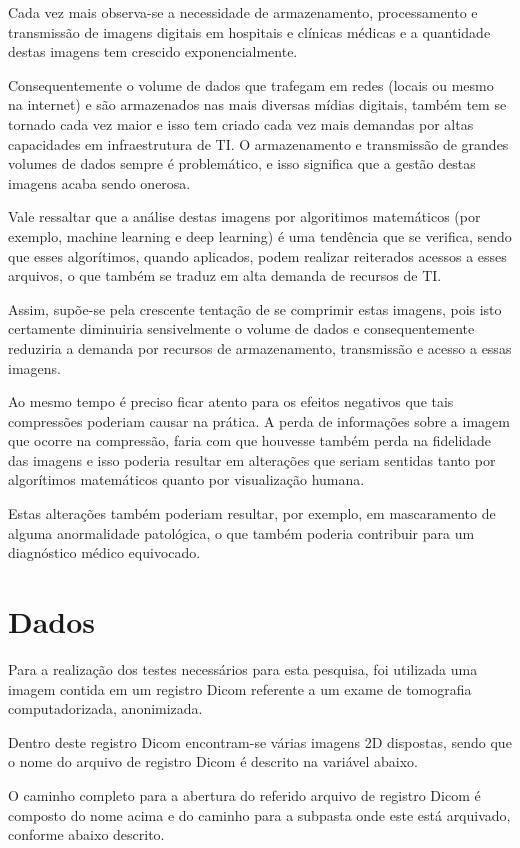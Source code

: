 \documentclass{IEEEtran}
\begin{document}
Cada vez mais observa-se a necessidade de armazenamento, processamento e
transmissão de imagens digitais em hospitais e clínicas médicas e a
quantidade destas imagens tem crescido exponencialmente.

Consequentemente o volume de dados que trafegam em redes (locais ou
mesmo na internet) e são armazenados nas mais diversas mídias digitais,
também tem se tornado cada vez maior e isso tem criado cada vez mais
demandas por altas capacidades em infraestrutura de TI. O armazenamento
e transmissão de grandes volumes de dados sempre é problemático, e isso
significa que a gestão destas imagens acaba sendo onerosa.

Vale ressaltar que a análise destas imagens por algoritimos matemáticos
(por exemplo, machine learning e deep learning) é uma tendência que se
verifica, sendo que esses algorítimos, quando aplicados, podem realizar
reiterados acessos a esses arquivos, o que também se traduz em alta
demanda de recursos de TI.

Assim, supõe-se pela crescente tentação de se comprimir estas imagens,
pois isto certamente diminuiria sensivelmente o volume de dados e
consequentemente reduziria a demanda por recursos de armazenamento,
transmissão e acesso a essas imagens.

Ao mesmo tempo é preciso ficar atento para os efeitos negativos que tais
compressões poderiam causar na prática. A perda de informações sobre a
imagem que ocorre na compressão, faria com que houvesse também perda na
fidelidade das imagens e isso poderia resultar em alterações que seriam
sentidas tanto por algorítimos matemáticos quanto por visualização
humana.

Estas alterações também poderiam resultar, por exemplo, em mascaramento
de alguma anormalidade patológica, o que também poderia contribuir para
um diagnóstico médico equivocado.

    \section{Dados}\label{dados}

    Para a realização dos testes necessários para esta pesquisa, foi
utilizada uma imagem contida em um registro Dicom referente a um exame
de tomografia computadorizada, anonimizada.

Dentro deste registro Dicom encontram-se várias imagens 2D dispostas,
sendo que o nome do arquivo de registro Dicom é descrito na variável
abaixo.


    O caminho completo para a abertura do referido arquivo de registro Dicom
é composto do nome acima e do caminho para a subpasta onde este está
arquivado, conforme abaixo descrito.
\end{document}
